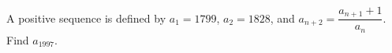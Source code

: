 A positive sequence is defined by $a_1=1799$, $a_2=1828$, and $a_{n+2}=\dfrac{a_{n+1}+1}{a_n}$. Find $a_{1997}$.
